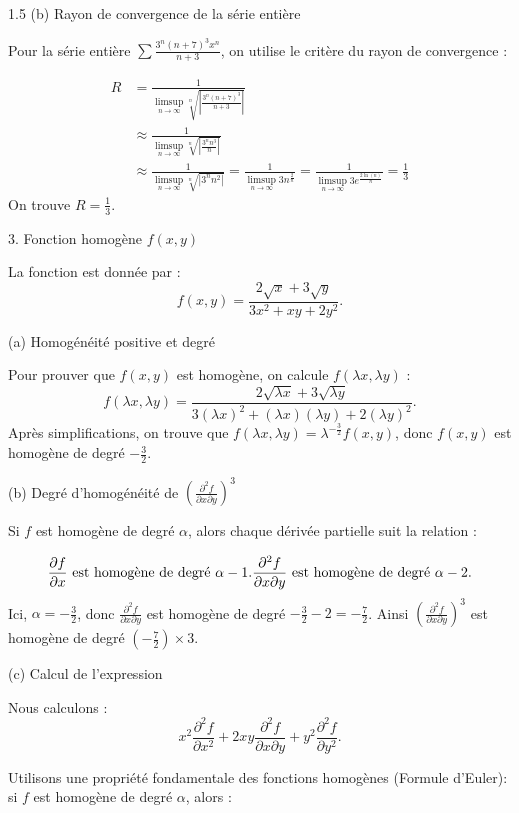 \documentclass[12pt]{article}
\begin{document}
\begin{spacing}{1.5}
(b) Rayon de convergence de la série entière

Pour la série entière $\sum \frac{3^n(n+7)^3x^n}{n+3}$, on utilise le critère du rayon de convergence :

\begin{align*}
R &= \frac{1}{\limsup_{n \to \infty} \sqrt[n]{\left|\frac{3^n(n+7)^3}{n+3}\right|}}\\
&\approx\frac{1}{\limsup_{n \to \infty} \sqrt[n]{\left|\frac{3^nn^3}{n}\right|}}\\
&\approx\frac{1}{\limsup_{n \to \infty} \sqrt[n]{\left|3^nn^2\right|}}=\frac{1}{\limsup_{n \to \infty} 3n^{\frac{2}{n}}}=\frac{1}{\limsup_{n \to \infty} 3e^{\frac{2\ln(n)}{n}}}=\frac{1}{3}
\end{align*}
On trouve $R = \frac{1}{3}$.

3. Fonction homogène $f(x, y)$

La fonction est donnée par :
\[
f(x, y) = \frac{2\sqrt{x} + 3\sqrt{y}}{3x^2 + xy + 2y^2}.
\]

(a) Homogénéité positive et degré

Pour prouver que $f(x, y)$ est homogène, on calcule $f(\lambda x, \lambda y)$ :
\[
f(\lambda x, \lambda y) = \frac{2\sqrt{\lambda x} + 3\sqrt{\lambda y}}{3(\lambda x)^2 + (\lambda x)(\lambda y) + 2(\lambda y)^2}.
\]
Après simplifications, on trouve que $f(\lambda x, \lambda y) = \lambda^{-\frac{3}{2}} f(x, y)$, donc $f(x, y)$ est homogène de degré $-\frac{3}{2}$.

(b) Degré d'homogénéité de $(\frac{\partial^2 f}{\partial x \partial y})^3$

Si $f$ est homogène de degré $\alpha$, alors chaque dérivée partielle suit la relation :

\[
\frac{\partial f}{\partial x } \text{ est homogène de degré } \alpha - 1.\\
\frac{\partial^2 f}{\partial x \partial y} \text{ est homogène de degré } \alpha - 2.
\]
Ici, $\alpha = -\frac{3}{2}$, donc $\frac{\partial^2 f}{\partial x \partial y}$ est homogène de degré $-\frac{3}{2}-2=-\frac{7}{2}$. Ainsi $(\frac{\partial^2 f}{\partial x \partial y})^3$ est homogène de degré $(-\frac{7}{2})\times 3$.

(c) Calcul de l'expression

Nous calculons :
\[
x^2 \frac{\partial^2 f}{\partial x^2} + 2xy \frac{\partial^2 f}{\partial x \partial y} + y^2 \frac{\partial^2 f}{\partial y^2}.
\]

Utilisons une propriété fondamentale des fonctions homogènes (Formule d'Euler): si $f$ est homogène de degré $\alpha$, alors :



\end{spacing}
\end{document}
